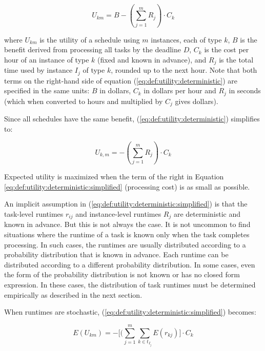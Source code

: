 \documentclass[12pt]{report}
\begin{document}
\begin{equation}
\label{eq:def:utility:deterministic}
	U_{km} = B - \left(\sum_{j=1}^{m} R_{j} \right) \cdot C_k
\end{equation}

where $U_{km}$ is the utility of a schedule using $m$ instances, each of type $k$, $B$ is the benefit derived from processing all tasks by the deadline $D$, $C_k$ is the cost per hour of an instance of type $k$ (fixed and known in advance), and $R_j$ is the total time used by instance $I_j$ of type $k$, rounded up to the next hour.
Note that both terms on the right-hand side of equation (\ref{eq:def:utility:deterministic}) are specified in the same units: $B$ in dollars, $C_k$ in dollars per hour and $R_j$ in seconds (which when converted to hours and multiplied by $C_j$ gives dollars).

Since all schedules have the same benefit, (\ref{eq:def:utility:deterministic}) simplifies to:

\begin{equation}
\label{eq:def:utility:deterministic:simplified}
	U_{k,m} = - \left(\sum_{j=1}^{m} R_{j} \right) \cdot C_k
\end{equation}

Expected utility is maximized when the term of the right in Equation \ref{eq:def:utility:deterministic:simplified} (processing cost) is as small as possible.

An implicit assumption in (\ref{eq:def:utility:deterministic:simplified}) is that the task-level runtimes $r_{ij}$ and instance-level runtimes $R_j$ are deterministic and known in advance.
But this is not always the case.
It is not uncommon to find situations where the runtime of a task is known only when the task completes processing.
In such cases, the runtimes are usually distributed according to a probability distribution that is known in advance.
Each runtime can be distributed according to a different probability distribution.
In some cases, even the form of the probability distribution is not known or has no closed form expression.
In these cases, the distribution of task runtimes must be determined empirically as described in the next section.

When runtimes are stochastic, (\ref{eq:def:utility:deterministic:simplified}) becomes:

\begin{equation}
\label{eq:def:utility:stochastic}
	E(U_{km}) = - \bigg[(\sum_{j=1}^{m} \sum_{k \in t_{I_j}} E(r_{kj}) \bigg] \cdot C_k
\end{equation}
\end{document}
